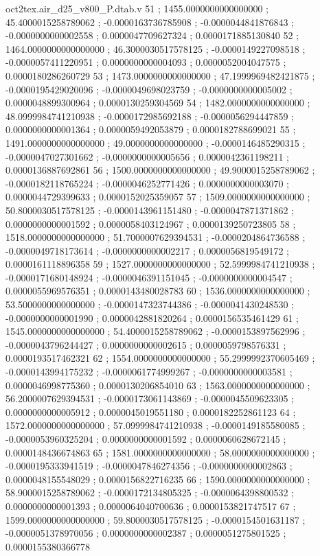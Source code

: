 \begin{filecontents}[overwrite]{oct2tex.air_d25_v800_P.dtab.v}
51 ; 1455.0000000000000000 ; 45.4000015258789062 ; -0.0000163736785908 ; -0.0000044841876843 ; -0.0000000000002558 ; 0.0000047709627324 ; 0.0000171885130840
52 ; 1464.0000000000000000 ; 46.3000030517578125 ; -0.0000149227098518 ; -0.0000057411220951 ; 0.0000000000004093 ; 0.0000052004047575 ; 0.0000180286260729
53 ; 1473.0000000000000000 ; 47.1999969482421875 ; -0.0000195429020096 ; -0.0000049698023759 ; -0.0000000000005002 ; 0.0000048899300964 ; 0.0000130259304569
54 ; 1482.0000000000000000 ; 48.0999984741210938 ; -0.0000172985692188 ; -0.0000056294447859 ; 0.0000000000001364 ; 0.0000059492053879 ; 0.0000182788699021
55 ; 1491.0000000000000000 ; 49.0000000000000000 ; -0.0000146485290315 ; -0.0000047027301662 ; -0.0000000000005656 ; 0.0000042361198211 ; 0.0000136887692861
56 ; 1500.0000000000000000 ; 49.9000015258789062 ; -0.0000182118765224 ; -0.0000046252771426 ; 0.0000000000003070 ; 0.0000044729399633 ; 0.0000152025359057
57 ; 1509.0000000000000000 ; 50.8000030517578125 ; -0.0000143961151480 ; -0.0000047871371862 ; 0.0000000000001592 ; 0.0000058403124967 ; 0.0000139250723805
58 ; 1518.0000000000000000 ; 51.7000007629394531 ; -0.0000204864736588 ; -0.0000049718173614 ; -0.0000000000002217 ; 0.0000056819549172 ; 0.0000161118896358
59 ; 1527.0000000000000000 ; 52.5999984741210938 ; -0.0000171680148924 ; -0.0000046391151045 ; -0.0000000000004547 ; 0.0000055969576351 ; 0.0000143480028783
60 ; 1536.0000000000000000 ; 53.5000000000000000 ; -0.0000147323744386 ; -0.0000041430248530 ; -0.0000000000001990 ; 0.0000042881820264 ; 0.0000156535461429
61 ; 1545.0000000000000000 ; 54.4000015258789062 ; -0.0000153897562996 ; -0.0000043796244427 ; 0.0000000000002615 ; 0.0000059798576331 ; 0.0000193517462321
62 ; 1554.0000000000000000 ; 55.2999992370605469 ; -0.0000143994175232 ; -0.0000061774999267 ; -0.0000000000003581 ; 0.0000046998775360 ; 0.0000130206854010
63 ; 1563.0000000000000000 ; 56.2000007629394531 ; -0.0000173061143869 ; -0.0000045509623305 ; 0.0000000000005912 ; 0.0000045019551180 ; 0.0000182252861123
64 ; 1572.0000000000000000 ; 57.0999984741210938 ; -0.0000149185580085 ; -0.0000053960325204 ; 0.0000000000001592 ; 0.0000060628672145 ; 0.0000148436674863
65 ; 1581.0000000000000000 ; 58.0000000000000000 ; -0.0000195333941519 ; -0.0000047846274356 ; -0.0000000000002863 ; 0.0000048155548029 ; 0.0000156822716235
66 ; 1590.0000000000000000 ; 58.9000015258789062 ; -0.0000172134805325 ; -0.0000064398800532 ; 0.0000000000001393 ; 0.0000064040700636 ; 0.0000153821747517
67 ; 1599.0000000000000000 ; 59.8000030517578125 ; -0.0000154501631187 ; -0.0000051378970056 ; 0.0000000000002387 ; 0.0000051275801525 ; 0.0000155380366778

\end{filecontents}
